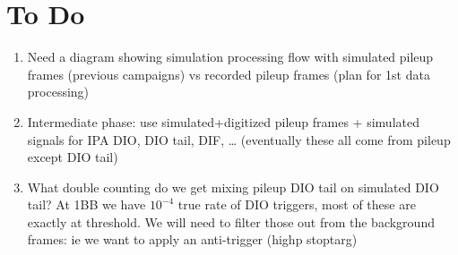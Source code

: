 \section{To Do}
\begin{enumerate}
\item Need a diagram showing simulation processing flow with simulated pileup frames (previous campaigns) vs recorded pileup frames (plan for 1st data processing)
\item Intermediate phase: use simulated+digitized pileup frames + simulated signals for IPA DIO, DIO tail, DIF, … (eventually these all come from pileup except DIO tail)
\item What double counting do we get mixing pileup DIO tail on simulated DIO tail?  At 1BB we have $10^{-4}$ true rate of DIO triggers, most of these are exactly at threshold.  We will need to filter those out from the background frames: ie we want to apply an anti-trigger (highp stoptarg)
\end{enumerate}